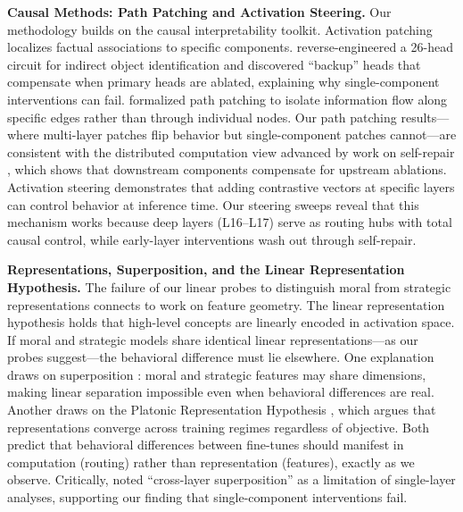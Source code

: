 \documentclass[11pt, letterpaper]{article}
\begin{document}
\textbf{Causal Methods: Path Patching and Activation Steering.}
Our methodology builds on the causal interpretability toolkit. Activation patching \citep{meng2022locating, geiger2021causal} localizes factual associations to specific components. \citet{wang2022interpretability} reverse-engineered a 26-head circuit for indirect object identification and discovered ``backup'' heads that compensate when primary heads are ablated, explaining why single-component interventions can fail. \citet{goldowsky2023localizing} formalized path patching to isolate information flow along specific edges rather than through individual nodes. Our path patching results---where multi-layer patches flip behavior but single-component patches cannot---are consistent with the distributed computation view advanced by work on self-repair \citep{mcgrath2023hydra, rushing2024selfrepair}, which shows that downstream components compensate for upstream ablations. Activation steering \citep{turner2023steering, li2023inference, rimsky2024steering} demonstrates that adding contrastive vectors at specific layers can control behavior at inference time. Our steering sweeps reveal that this mechanism works because deep layers (L16--L17) serve as routing hubs with total causal control, while early-layer interventions wash out through self-repair.

\textbf{Representations, Superposition, and the Linear Representation Hypothesis.}
The failure of our linear probes to distinguish moral from strategic representations connects to work on feature geometry. The linear representation hypothesis \citep{marks2023geometry, burns2023discovering, zou2023representation} holds that high-level concepts are linearly encoded in activation space. If moral and strategic models share identical linear representations---as our probes suggest---the behavioral difference must lie elsewhere. One explanation draws on superposition \citep{elhage2022superposition}: moral and strategic features may share dimensions, making linear separation impossible even when behavioral differences are real. Another draws on the Platonic Representation Hypothesis \citep{huh2024platonic}, which argues that representations converge across training regimes regardless of objective. Both predict that behavioral differences between fine-tunes should manifest in computation (routing) rather than representation (features), exactly as we observe. Critically, \citet{templeton2024scaling} noted ``cross-layer superposition'' as a limitation of single-layer analyses, supporting our finding that single-component interventions fail.
\end{document}
